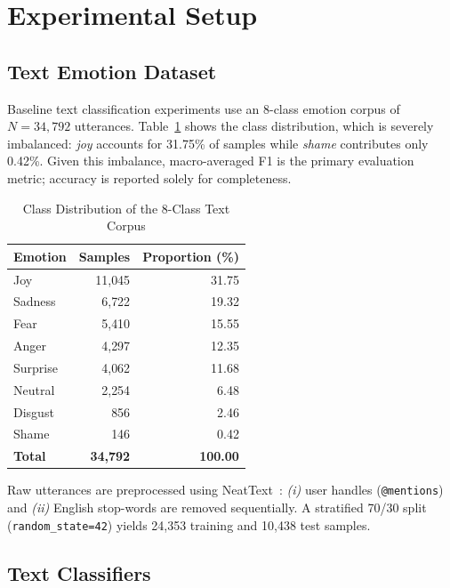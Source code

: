 \documentclass[sigconf, review=true]{acmart}
\begin{document}
\section{Experimental Setup}
\label{sec:setup}

\subsection{Text Emotion Dataset}

Baseline text classification experiments use an 8-class emotion
corpus of $N{=}34{,}792$ utterances.
Table~\ref{tab:class_dist} shows the class distribution, which
is severely imbalanced: \textit{joy} accounts for 31.75\% of
samples while \textit{shame} contributes only 0.42\%.
Given this imbalance, macro-averaged F1 is the primary evaluation
metric; accuracy is reported solely for completeness.

\begin{table}[htbp]
\centering
\caption{Class Distribution of the 8-Class Text Corpus}
\label{tab:class_dist}
\begin{tabular}{lrr}
\toprule
\textbf{Emotion} & \textbf{Samples} & \textbf{Proportion (\%)} \\
\midrule
Joy      & 11{,}045 & 31.75 \\
Sadness  &  6{,}722 & 19.32 \\
Fear     &  5{,}410 & 15.55 \\
Anger    &  4{,}297 & 12.35 \\
Surprise &  4{,}062 & 11.68 \\
Neutral  &  2{,}254 &  6.48 \\
Disgust  &    856   &  2.46 \\
Shame    &    146   &  0.42 \\
\midrule
\textbf{Total} & \textbf{34{,}792} & \textbf{100.00} \\
\bottomrule
\end{tabular}
\end{table}

Raw utterances are preprocessed using NeatText~\cite{neattext2021}:
\textit{(i)} user handles (\texttt{@mentions}) and
\textit{(ii)} English stop-words are removed sequentially.
A stratified 70/30 split (\texttt{random\_state=42}) yields
24,353 training and 10,438 test samples.

\subsection{Text Classifiers}
\end{document}

